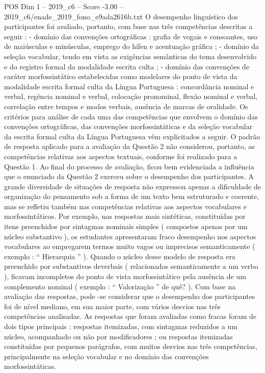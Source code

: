 \begin{textsample}{POS Dim 1 – 2019\_c6 – Score -3.00 – 2019\_c6/enade\_2019\_fono\_e9ada2616b.txt}
O desempenho linguístico dos participantes foi avaliado, portanto, com base nas três competências descritas a seguir : - domínio das convenções ortográficas : grafia de vogais e consoantes, uso de maiúsculas e minúsculas, emprego do hífen e acentuação gráfica ; - domínio da seleção vocabular, tendo em vista as exigências semânticas do tema desenvolvido e do registro formal da modalidade escrita culta ; - domínio das convenções de caráter morfossintático estabelecidas como modelares do ponto de vista da modalidade escrita formal culta da Língua Portuguesa : concordância nominal e verbal, regência nominal e verbal, colocação pronominal, flexão nominal e verbal, correlação entre tempos e modos verbais, ausência de marcas de oralidade.
Os critérios para análise de cada uma das competências que envolvem o domínio das convenções ortográficas, das convenções morfossintáticas e da seleção vocabular da escrita formal culta da Língua Portuguesa vêm explicitados a seguir.
O padrão de resposta aplicado para a avaliação da Questão 2 não considerou, portanto, as competências relativas aos aspectos textuais, conforme foi realizado para a Questão 1.
Ao final do processo de avaliação, ficou bem evidenciada a influência que o enunciado da Questão 2 exerceu sobre o desempenho dos participantes.
A grande diversidade de situações de resposta não expressou apenas a dificuldade de organização do pensamento sob a forma de um texto bem estruturado e coerente, mas se refletiu também nas competências relativas aos aspectos vocabulares e morfossintáticos.
Por exemplo, nas respostas mais sintéticas, constituídas por itens preenchidos por sintagmas nominais simples ( compostos apenas por um núcleo substantivo ), os estudantes apresentaram fraco desempenho nos aspectos vocabulares ao empregarem termos muito vagos ou imprecisos semanticamente ( exemplo : “ Hierarquia ” ).
Quando o núcleo desse modelo de resposta era preenchido por substantivos deverbais ( relacionados semanticamente a um verbo ), ficavam incompletos do ponto de vista morfossintático pela ausência de um complemento nominal ( exemplo : “ Valorização ” de quê? ).
Com base na avaliação das respostas, pode -se considerar que o desempenho dos participantes foi de nível mediano, em sua maior parte, com vários desvios nas três competências analisadas.
As respostas que foram avaliadas como fracas foram de dois tipos principais : respostas itemizadas, com sintagmas reduzidos a um núcleo, acompanhado ou não por modificadores ; ou respostas itemizadas constituídas por pequenos parágrafos, com muitos desvios nas três competências, principalmente na seleção vocabular e no domínio das convenções morfossintáticas.

\end{textsample}
